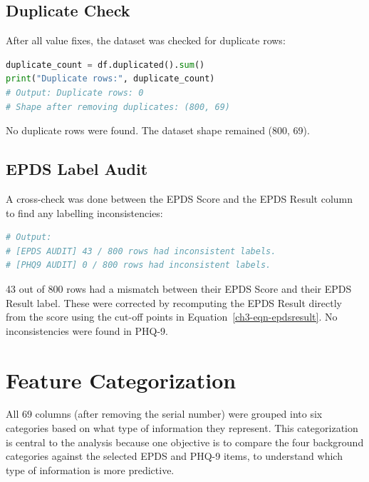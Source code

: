 \subsection{Duplicate Check}

After all value fixes, the dataset was checked for duplicate rows:

\begin{lstlisting}[language=Python, caption={Duplicate row check after cleaning.}]
duplicate_count = df.duplicated().sum()
print("Duplicate rows:", duplicate_count)
# Output: Duplicate rows: 0
# Shape after removing duplicates: (800, 69)
\end{lstlisting}

No duplicate rows were found. The dataset shape remained (800, 69).

\subsection{EPDS Label Audit}

A cross-check was done between the EPDS Score and the EPDS Result column to find any labelling inconsistencies:

\begin{lstlisting}[language=Python, caption={EPDS audit: check score-label consistency.}]
# Output:
# [EPDS AUDIT] 43 / 800 rows had inconsistent labels.
# [PHQ9 AUDIT] 0 / 800 rows had inconsistent labels.
\end{lstlisting}

43 out of 800 rows had a mismatch between their EPDS Score and their EPDS Result label. These were corrected by recomputing the EPDS Result directly from the score using the cut-off points in Equation~\ref{ch3-eqn-epdsresult}. No inconsistencies were found in PHQ-9.

\section{Feature Categorization}
\label{ch3-sec-categories}

All 69 columns (after removing the serial number) were grouped into six categories based on what type of information they represent. This categorization is central to the analysis because one objective is to compare the four background categories against the selected EPDS and PHQ-9 items, to understand which type of information is more predictive.

